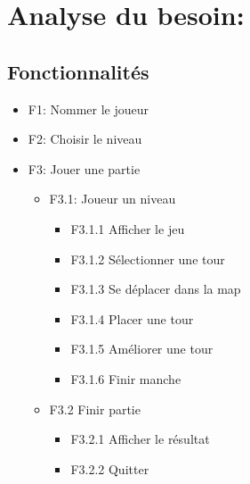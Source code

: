 \documentclass{scrartcl}
\begin{document}
 \section{Analyse du besoin:}
	\subsection{Fonctionnalités}
	  \begin{itemize}
	  \item F1: Nommer le joueur
	  \item F2: Choisir le niveau
	  \item F3: Jouer une partie
	
	  \begin{itemize}
	      \item F3.1: Joueur un niveau
	      \begin{itemize}
		  \item F3.1.1 Afficher le jeu
		  \item F3.1.2 Sélectionner une tour
		  \item F3.1.3 Se déplacer dans la map
		  \item F3.1.4 Placer une tour
		  \item F3.1.5 Améliorer une tour
		  \item F3.1.6 Finir manche
		  \newline
		\end{itemize}
		
	      \item F3.2 Finir partie
		\begin{itemize}
		\item F3.2.1 Afficher le résultat
		\item F3.2.2 Quitter
		\end{itemize}
	  \end{itemize}
	\end{itemize}
\end{document}
